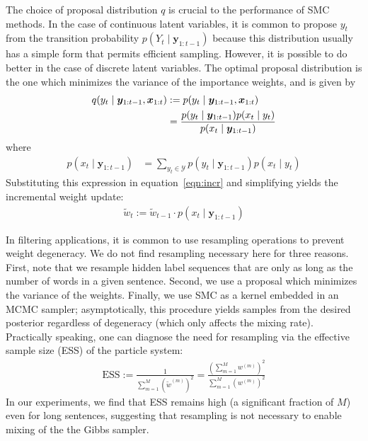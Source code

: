 \documentclass[11pt]{article}
\begin{document}
\vspace{5pt}

 The choice of proposal
distribution $q$ is crucial to the performance of SMC methods. In the case
of continuous latent variables, it is common to propose $y_t$ from the transition
probability $p(Y_t \mid \bm{y}_{1:t-1})$ because this distribution usually has
a simple form that permits efficient sampling.  However,
it is possible to do better in the case of discrete latent
variables. The optimal proposal distribution is the one which
minimizes the variance of the importance weights, and is given by
\begin{align}\label{eqn:opt}
q(y_t \mid \bm{y}_{1:t-1}, \bm{x}_{1:t}) &:= p(y_t \mid \bm{y}_{1:t-1}, \bm{x}_{1:t}) \\
&= \frac{p(y_t \mid \bm{y}_{1:t-1}) p(x_t \mid y_t) }{p(x_t \mid \bm{y}_{1:t-1})} \notag
\end{align}
where
\begin{align}\label{eqn:optdenom}
p(x_t \mid \bm{y}_{1:t-1}) \!&=\! \sum_{y_t \in \mathcal{Y}} p(y_t \mid \bm{y}_{1:t-1}) p(x_t \mid y_t)
\end{align}
Substituting this expression in equation~\eqref{eqn:incr} and simplifying yields the
incremental weight update:
\begin{align}\label{eqn:weight}
\tilde{w}_t := \tilde{w}_{t-1} \cdot p(x_t \mid \bm{y}_{1:t-1})
\end{align}

\vspace{5pt}

 In filtering applications, it is common to
use resampling operations to prevent weight degeneracy. We do not find
resampling necessary here for three reasons. First, note that we
resample hidden label sequences that are only as long as the number of
words in a given sentence. Second, we use a proposal which minimizes
the variance of the weights. Finally, we use SMC as a kernel embedded
in an MCMC sampler; asymptotically, this procedure yields samples from
the desired posterior regardless of degeneracy (which only affects
the mixing rate). Practically speaking, one can diagnose the need for
resampling via the effective sample size (ESS) of the particle
system:
\begin{align}\nonumber
  \text{ESS} := \frac{1}{\sum_{m=1}^M (\tilde{w}^{(m)})^2} = \frac{(\sum^M_{m=1} w^{(m)})^2}{\sum_{m=1}^M (w^{(m)})^2}
\end{align}
In our experiments, we find that ESS remains high (a significant
fraction of $M$) even for long sentences, suggesting that resampling
is not necessary to enable mixing of the the Gibbs sampler.
\end{document}
